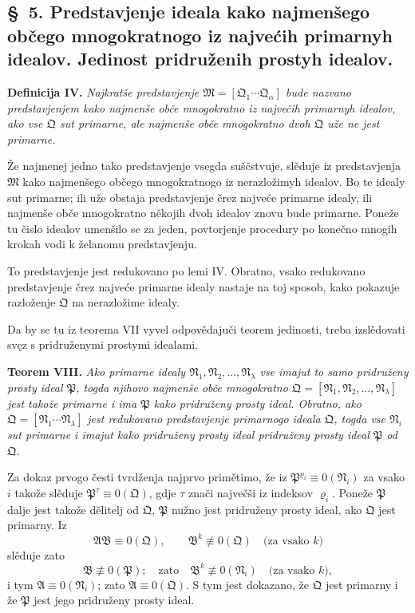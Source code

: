 \documentclass[11pt]{article}
\newcommand{\ideal}[1]{\mathfrak{#1}}
\begin{document}

\setcounter{footnote}{20}
\subsection*{\S~5. Predstavjenje ideala kako najmenšego občego mnogokratnogo iz najvećih primarnyh idealov. Jedinost pridruženih prostyh idealov.}

\textbf{Definicija IV.} \emph{Najkratše predstavjenje \(\ideal M=[\ideal Q_1\cdots\ideal Q_\alpha]\) bude nazvano predstavjenjem kako najmenše obče mnogokratno iz največih primarnyh idealov, ako vse \(\ideal Q\) sut primarne, ale najmenše obče mnogokratno dvoh \(\ideal Q\) uže ne jest primarne.}

Že najmenej jedno tako predstavjenje vsegda suščstvuje, slěduje iz predstavjenja \(\ideal M\) kako najmenšego občego mnogokratnogo iz nerazložimyh idealov. Bo te idealy sut primarne; ili uže obstaja predstavjenje črez najveće primarne idealy, ili najmenše obče mnogokratno někojih dvoh idealov znovu bude primarne. Poneže tu čislo idealov umenšilo se za jeden, povtorjenje procedury po konečno mnogih krokah vodi k želanomu predstavjenju.

To predstavjenje jest redukovano po lemi IV. Obratno, vsako redukovano predstavjenje črez najveće primarne idealy nastaje na toj sposob, kako pokazuje razloženje \(\ideal Q\) na nerazložime idealy.

Da by se tu iz teorema VII vyvel odpovědajuči teorem jedinosti, treba izslědovati svęz s pridruženymi prostymi idealami.

\textbf{Teorem VIII.} \emph{Ako primarne idealy \(\ideal N_1,\ideal N_2,\ldots,\ideal N_\lambda\) vse imajut to samo pridruženy prosty ideal \(\ideal P\), togda njihovo najmenše obče mnogokratno \(\ideal Q=[\ideal N_1,\ideal N_2,\ldots,\ideal N_\lambda]\) jest takože primarne i ima \(\ideal P\) kako pridruženy prosty ideal. Obratno, ako \(\ideal Q=[\ideal N_1\cdots\ideal N_\lambda]\) jest redukovano predstavjenje primarnogo ideala \(\ideal Q\), togda vse \(\ideal N_i\) sut primarne i imajut kako pridruženy prosty ideal pridruženy prosty ideal \(\ideal P\) od \(\ideal Q\).}

Za dokaz prvogo česti tvrdženja najprvo primětimo, že iz \(\ideal P^{\varrho_i}\equiv0(\ideal N_i)\) za vsako \(i\) takože slěduje \(\ideal P^\tau\equiv0(\ideal Q)\), gdje \(\tau\) znači največši iz indeksov \(\varrho_i\). Poneže \(\ideal P\) dalje jest takože dělitelj od \(\ideal Q\), \(\ideal P\) nužno jest pridruženy prosty ideal, ako \(\ideal Q\) jest primarny. Iz
\[
 \ideal A\ideal B\equiv0(\ideal Q),\qquad
 \ideal B^k\not\equiv0(\ideal Q)\quad\text{(za vsako }k)
\]
slěduje zato
\[
 \ideal B\not\equiv0(\ideal P);
 \quad\text{zato}\quad
 \ideal B^k\not\equiv0(\ideal N_i)\quad\text{(za vsako }k),
\]
i tym \(\ideal A\equiv0(\ideal N_i)\); zato \(\ideal A\equiv0(\ideal Q)\). S tym jest dokazano, že \(\ideal Q\) jest primarny i že \(\ideal P\) jest jego pridruženy prosty ideal.
\end{document}
